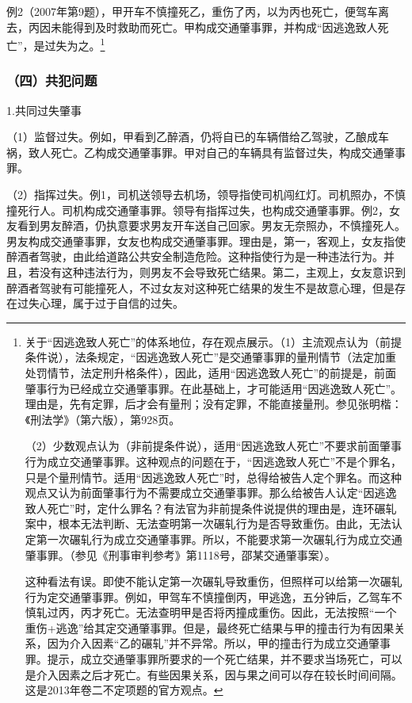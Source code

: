 例2（2007年第9题），甲开车不慎撞死乙，重伤了丙，以为丙也死亡，便驾车离去，丙因未能得到及时救助而死亡。甲构成交通肇事罪，并构成“因逃逸致人死亡”，是过失为之。\footnote{关于“因逃逸致人死亡”的体系地位，存在观点展示。（1）主流观点认为（前提条件说），法条规定，“因逃逸致人死亡”是交通肇事罪的量刑情节（法定加重处罚情节，法定刑升格条件），因此，适用“因逃逸致人死亡”的前提是，前面肇事行为已经成立交通肇事罪。在此基础上，才可能适用“因逃逸致人死亡”。理由是，先有定罪，后才会有量刑；没有定罪，不能直接量刑。参见张明楷：《刑法学》（第六版），第928页。

（2）少数观点认为（非前提条件说），适用“因逃逸致人死亡”不要求前面肇事行为成立交通肇事罪。这种观点的问题在于，“因逃逸致人死亡”不是个罪名，只是个量刑情节。适用“因逃逸致人死亡”时，总得给被告人定个罪名。而这种观点又认为前面肇事行为不需要成立交通肇事罪。那么给被告人认定“因逃逸致人死亡”时，定什么罪名？有法官为非前提条件说提供的理由是，连环碾轧案中，根本无法判断、无法查明第一次碾轧行为是否导致重伤。由此，无法认定第一次碾轧行为成立交通肇事罪。所以，不能要求第一次碾轧行为成立交通肇事罪。（参见《刑事审判参考》第1118号，邵某交通肇事案）。

这种看法有误。即使不能认定第一次碾轧导致重伤，但照样可以给第一次碾轧行为定交通肇事罪。例如，甲驾车不慎撞倒丙，甲逃逸，五分钟后，乙驾车不慎轧过丙，丙才死亡。无法查明甲是否将丙撞成重伤。因此，无法按照“一个重伤+逃逸”给其定交通肇事罪。但是，最终死亡结果与甲的撞击行为有因果关系，因为介入因素“乙的碾轧”并不异常。所以，甲的撞击行为成立交通肇事罪。提示，成立交通肇事罪所要求的一个死亡结果，并不要求当场死亡，可以是介入因素之后才死亡。有些因果关系，因与果之间可以存在较长时间间隔。这是2013年卷二不定项题的官方观点。}

\subsubsection*{（四）共犯问题}

1.共同过失肇事

（1）监督过失。例如，甲看到乙醉酒，仍将自已的车辆借给乙驾驶，乙酿成车祸，致人死亡。乙构成交通肇事罪。甲对自己的车辆具有监督过失，构成交通肇事罪。

（2）指挥过失。例1，司机送领导去机场，领导指使司机闯红灯。司机照办，不慎撞死行人。司机构成交通肇事罪。领导有指挥过失，也构成交通肇事罪。例2，女友看到男友醉酒，仍执意要求男友开车送自己回家。男友无奈照办，不慎撞死人。男友构成交通肇事罪，女友也构成交通肇事罪。理由是，第一，客观上，女友指使醉酒者驾驶，由此给道路公共安全制造危险。这种指使行为是一种违法行为。并且，若没有这种违法行为，则男友不会导致死亡结果。第二，主观上，女友意识到醉酒者驾驶有可能撞死人，不过女友对这种死亡结果的发生不是故意心理，但是存在过失心理，属于过于自信的过失。

